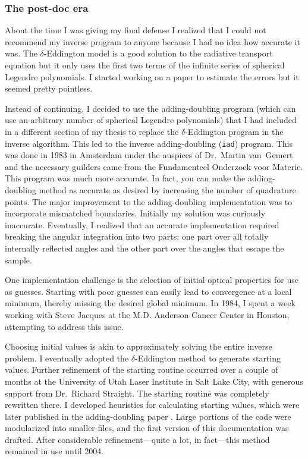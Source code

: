 \documentclass{article}
\newcommand\iadprog{\texttt{iad}}
\begin{document}
\subsubsection*{The post-doc era}
About the time I was giving my final defense I realized that I could not
recommend my inverse program to anyone because I had no idea how accurate it
was.  The $\delta$-Eddington model is a good solution to the radiative
transport equation but it only uses the first two terms of the infinite series
of spherical Legendre polynomials.  I started working on a paper to estimate the errors but it seemed pretty
pointless.

Instead of continuing, I decided to use the adding-doubling program (which can use an arbitrary number of
spherical Legendre polynomials) that I had included in a different section of my thesis to replace the
$\delta$-Eddington program in the inverse algorithm.  This
led to the inverse adding-doubling (\iadprog{}) program.  This was done in 1983 in Amsterdam
under the auspices of Dr.\ Martin van~Gemert and the necessary guilders came from the Fundamenteel
Onderzoek voor Materie.  This program was much more accurate.  In fact, you can
make the adding-doubling method as accurate as desired by increasing the number
of quadrature points.  The major improvement to the adding-doubling implementation was
to incorporate mismatched boundaries.  Initially my solution was curiously
inaccurate. Eventually, I realized that an
accurate implementation required breaking the angular integration into two parts: one part over 
all totally internally reflected angles and the other part over the angles that escape
the sample.

One implementation challenge is the selection of initial optical properties for use as guesses.
Starting with poor guesses can easily lead to convergence at a local minimum, thereby missing the
desired global minimum.  In 1984, I spent a week working with Steve Jacques at the M.D. Anderson
Cancer Center in Houston, attempting to address this issue.

Choosing initial values is akin to approximately solving the entire inverse problem.  I eventually
adopted the $\delta$-Eddington method to generate starting values.  Further refinement of the
starting routine occurred over a couple of months at the University of Utah Laser Institute in Salt
Lake City, with generous support from Dr.\ Richard Straight.  The starting routine was
completely rewritten there.  I developed heuristics for calculating starting values, which were later published in the adding-doubling paper \cite{prahl93a}. Large portions of the code were modularized into smaller files, and the first version of this documentation was drafted. After considerable refinement---quite a lot, in fact---this method remained in use until 2004.
\end{document}
